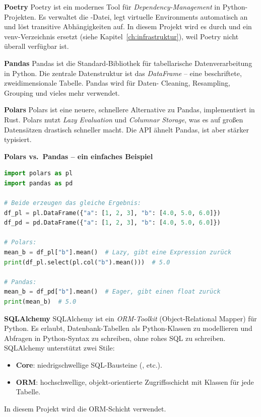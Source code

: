 \begin{definition}
\textbf{Poetry}
Poetry ist ein modernes Tool für \emph{Dependency-Management} in
Python-Projekten. Es verwaltet die -Datei, legt
virtuelle Environments automatisch an und löst transitive
Abhängigkeiten auf. In diesem Projekt wird es durch
 und ein venv-Verzeichnis ersetzt (siehe Kapitel~\ref{ch:infrastruktur}),
weil Poetry nicht überall verfügbar ist.
\end{definition}

\begin{definition}
\textbf{Pandas}
Pandas ist die Standard-Bibliothek für tabellarische Datenverarbeitung
in Python. Die zentrale Datenstruktur ist das \emph{DataFrame} -- eine
beschriftete, zweidimensionale Tabelle. Pandas wird für Daten-
Cleaning, Resampling, Grouping und vieles mehr verwendet.
\end{definition}

\begin{definition}
\textbf{Polars}
Polars ist eine neuere, schnellere Alternative zu Pandas, implementiert
in Rust. Polars nutzt \emph{Lazy Evaluation} und \emph{Columnar
Storage}, was es auf großen Datensätzen drastisch schneller macht.
Die API ähnelt Pandas, ist aber stärker typisiert.
\end{definition}

\begin{beispiel}
\textbf{Polars vs.\ Pandas -- ein einfaches Beispiel}
\begin{lstlisting}[language=python]
import polars as pl
import pandas as pd

# Beide erzeugen das gleiche Ergebnis:
df_pl = pl.DataFrame({"a": [1, 2, 3], "b": [4.0, 5.0, 6.0]})
df_pd = pd.DataFrame({"a": [1, 2, 3], "b": [4.0, 5.0, 6.0]})

# Polars:
mean_b = df_pl["b"].mean()  # Lazy, gibt eine Expression zurück
print(df_pl.select(pl.col("b").mean()))  # 5.0

# Pandas:
mean_b = df_pd["b"].mean()  # Eager, gibt einen float zurück
print(mean_b)  # 5.0
\end{lstlisting}
\end{beispiel}

\begin{definition}
\textbf{SQLAlchemy}
SQLAlchemy ist ein \emph{ORM-Toolkit} (Object-Relational Mapper) für
Python. Es erlaubt, Datenbank-Tabellen als Python-Klassen zu
modellieren und Abfragen in Python-Syntax zu schreiben, ohne rohes
SQL zu schreiben. SQLAlchemy unterstützt zwei Stile:

\begin{itemize}
  \item \textbf{Core}: niedrigschwellige SQL-Bausteine
        (,  etc.).
  \item \textbf{ORM}: hochschwellige, objekt-orientierte
        Zugriffsschicht mit Klassen für jede Tabelle.
\end{itemize}
In diesem Projekt wird die ORM-Schicht verwendet.
\end{definition}


